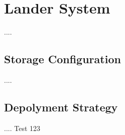\chapter{Lander System}
\label{chap:lander}
....

\section{Storage Configuration}
\label{sec:storage}
....

\section{Depolyment Strategy}
\label{sec:deployment}
....
Test 123